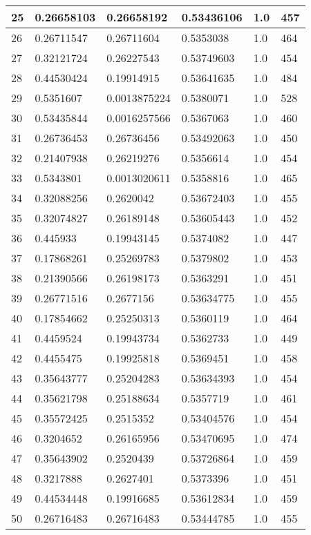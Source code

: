 \begin{longtable}{|l|l|l|l|l|l|}
25 & 0.26658103 & 0.26658192 & 0.53436106 & 1.0 & 457 \\ \hline 
26 & 0.26711547 & 0.26711604 & 0.5353038 & 1.0 & 464 \\ \hline 
27 & 0.32121724 & 0.26227543 & 0.53749603 & 1.0 & 454 \\ \hline 
28 & 0.44530424 & 0.19914915 & 0.53641635 & 1.0 & 484 \\ \hline 
29 & 0.5351607 & 0.0013875224 & 0.5380071 & 1.0 & 528 \\ \hline 
30 & 0.53435844 & 0.0016257566 & 0.5367063 & 1.0 & 460 \\ \hline 
31 & 0.26736453 & 0.26736456 & 0.53492063 & 1.0 & 450 \\ \hline 
32 & 0.21407938 & 0.26219276 & 0.5356614 & 1.0 & 454 \\ \hline 
33 & 0.5343801 & 0.0013020611 & 0.5358816 & 1.0 & 465 \\ \hline 
34 & 0.32088256 & 0.2620042 & 0.53672403 & 1.0 & 455 \\ \hline 
35 & 0.32074827 & 0.26189148 & 0.53605443 & 1.0 & 452 \\ \hline 
36 & 0.445933 & 0.19943145 & 0.5374082 & 1.0 & 447 \\ \hline 
37 & 0.17868261 & 0.25269783 & 0.5379802 & 1.0 & 453 \\ \hline 
38 & 0.21390566 & 0.26198173 & 0.5363291 & 1.0 & 451 \\ \hline 
39 & 0.26771516 & 0.2677156 & 0.53634775 & 1.0 & 455 \\ \hline 
40 & 0.17854662 & 0.25250313 & 0.5360119 & 1.0 & 464 \\ \hline 
41 & 0.4459524 & 0.19943734 & 0.5362733 & 1.0 & 449 \\ \hline 
42 & 0.4455475 & 0.19925818 & 0.5369451 & 1.0 & 458 \\ \hline 
43 & 0.35643777 & 0.25204283 & 0.53634393 & 1.0 & 454 \\ \hline 
44 & 0.35621798 & 0.25188634 & 0.5357719 & 1.0 & 461 \\ \hline 
45 & 0.35572425 & 0.2515352 & 0.53404576 & 1.0 & 454 \\ \hline 
46 & 0.3204652 & 0.26165956 & 0.53470695 & 1.0 & 474 \\ \hline 
47 & 0.35643902 & 0.2520439 & 0.53726864 & 1.0 & 459 \\ \hline 
48 & 0.3217888 & 0.2627401 & 0.5373396 & 1.0 & 451 \\ \hline 
49 & 0.44534448 & 0.19916685 & 0.53612834 & 1.0 & 459 \\ \hline 
50 & 0.26716483 & 0.26716483 & 0.53444785 & 1.0 & 455 \\ \hline 
\end{longtable}